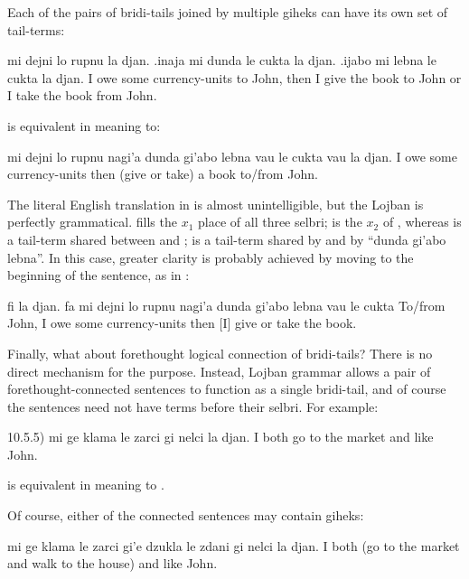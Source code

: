 Each of the pairs of bridi-tails joined by multiple giheks
    can have its own set of tail-terms:
\begin{example}
mi dejni lo rupnu la djan.\n
\T	.inaja mi dunda le cukta la djan.\n
\T	.ijabo mi lebna le cukta la djan.\n
{} I owe some currency-units to John,\n
\T	then I give the book to John\n
\T	or I take the book from John.
\end{example}

{\noindent}is equivalent in meaning to:
\begin{example}
mi dejni lo rupnu nagi'a dunda gi'abo lebna vau\n
\T	le cukta vau la djan.\n
{} I owe some currency-units then (give or take)\n
\T	a book to/from John.
\end{example}

The literal English translation in  is almost unintelligible, but the Lojban is perfectly
    grammatical.  fills the $x_1$ place of all three selbri;
     is the $x_2$ of , whereas  is a
    tail-term shared between  and ; 
    is a tail-term shared by  and by ``dunda gi'abo
    lebna''. In this case, greater clarity is probably achieved by
    moving  to the beginning of the sentence, as in :
\begin{example}
fi la djan. fa mi dejni lo rupnu\n
\T	nagi'a dunda gi'abo lebna vau le cukta\n
To/from John,  I owe some currency-units\n
\T	then [I] give or take the book.
\end{example}

Finally, what about forethought logical connection of
    bridi-tails? There is no direct mechanism for the purpose.
    Instead, Lojban grammar allows a pair of forethought-connected
    sentences to function as a single bridi-tail, and of course the
    sentences need not have terms before their selbri. For example:

\label{html:e10d5.5}
10.5.5)    mi ge klama le zarci gi nelci la djan.
    I both go to the market and like John.

is equivalent in meaning to . 

Of course, either of the connected sentences may contain
    giheks:
\begin{example}
mi ge klama le zarci gi'e dzukla le zdani\n
\T	gi nelci la djan.\n
I both (go to the market and walk to the house)\n
\T	and like John.
\end{example}

